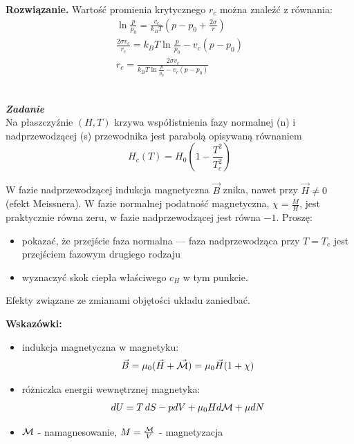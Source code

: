\documentclass[11pt,a4paper]{article}
\newcounter{zadanie}\newcommand{\zadanie}[1][]{\addtocounter{zadanie}{1} ~\\ {\bf \emph{Zadanie \arabic{zadanie} #1 }} \\}
\newenvironment{solution}{\vspace{1cm} \par\textbf{Rozwiązanie.} \vspace{1cm}}{}
\begin{document}
\begin{solution}
Wartość promienia krytycznego $r_c$ można znaleźć z równania:
\begin{align*}
  \ln\frac{p}{p_0} = \frac{v_c}{k_B T}\left(p - p_0 + \frac{2\sigma}{r}\right) \\
  \frac{2\sigma v_c}{r_c} = k_B T \ln\frac{p}{p_0} - v_c(p - p_0) \\
  r_c = \frac{2\sigma v_c}{k_B T \ln\frac{p}{p_0} - v_c(p - p_0)}
\end{align*}

\newpage   
\end{solution}
\zadanie[]

Na płaszczyźnie $(H, T)$ krzywa współistnienia fazy normalnej (n) i nadprzewodzącej (s) przewodnika jest parabolą
opisywaną równaniem
\[
H_c(T) = H_0\left(1 - \frac{T^2}{T_c^2}\right)
\]

W fazie nadprzewodzącej indukcja magnetyczna $\vec{B}$ znika, nawet przy 
$\vec{H} \neq 0$ (efekt Meissnera). W fazie normalnej podatność magnetyczna,
$\chi = \frac{M}{H}$, jest praktycznie równa zeru, w fazie nadprzewodzącej jest 
równa $-1$. Proszę:
\begin{itemize}
  \item pokazać, że przejście faza normalna --- faza nadprzewodząca przy 
        $T = T_c$ jest przejściem  fazowym  drugiego rodzaju 
  \item wyznaczyć skok ciepła właściwego $c_H$ w tym punkcie.
\end{itemize}

Efekty związane ze zmianami objętości układu zaniedbać.  

\vskip 0.2cm

{\bf Wskazówki:}
\begin{itemize}
  \item indukcja magnetyczna w magnetyku:
  \begin{align*}
    \vec{B} = \mu_{0}(\vec{H} + \vec{\cal M}) = \mu_0 \vec{H}(1 + \chi)
  \end{align*}
  \item różniczka energii wewnętrznej magnetyka:
  \begin{align*}
    dU = T\,dS -p dV + \mu_0 H d {\cal  M} + \mu dN
  \end{align*}
  \item ${\cal M}$ - namagnesowanie, 
        $M = \frac{{\cal M}}{V}$ - magnetyzacja
\end{itemize}
\end{document}
